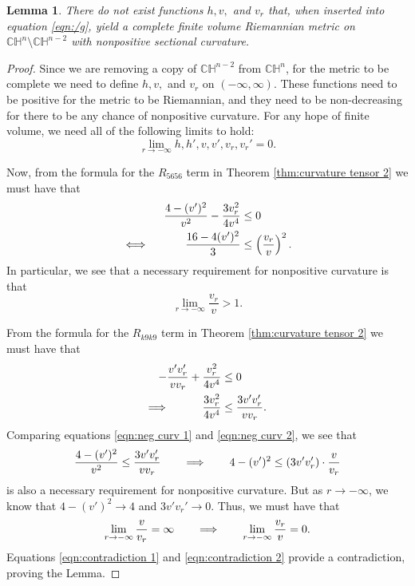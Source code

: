 \documentclass[10pt]{amsart}
\def\H{\mathbb{H}}
\def\C{\mathbb{C}}
\newtheorem{lemma}[theorem]{Lemma}
\theoremstyle{definition}
\theoremstyle{remark}
\numberwithin{equation}{section}
\begin{document}
\begin{lemma}
There do not exist functions $h, v, $ and $v_r$ that, when inserted into equation \eqref{eqn:/g}, yield a complete finite volume Riemannian metric on $\C \H^n \setminus \C \H^{n-2}$ with nonpositive sectional curvature.
\end{lemma}

\begin{proof}
Since we are removing a copy of $\C \H^{n-2}$ from $\C \H^n$, for the metric to be complete we need to define $h, v, $ and $v_r$ on $(- \infty, \infty)$.  
These functions need to be positive for the metric to be Riemannian, and they need to be non-decreasing for there to be any chance of nonpositive curvature.  
For any hope of finite volume, we need all of the following limits to hold:
	\begin{equation*}
	\lim_{r \to - \infty} h, h', v, v', v_r, v_r' = 0.
	\end{equation*}
	
Now, from the formula for the $R_{5656}$ term in Theorem \ref{thm:curvature tensor 2} we must have that
	\begin{align}
	\frac{4-(v')^2}{v^2} - \frac{3v_r^2}{4v^4} &\leq 0  \label{eqn:neg curv 1}  \\
	\iff	\hskip 30pt	\frac{16 - 4(v')^2}{3} &\leq \left( \frac{v_r}{v} \right)^2.  \nonumber
	\end{align}
In particular, we see that a necessary requirement for nonpositive curvature is that
	\begin{equation}\label{eqn:contradiction 1}
	\lim_{r \to - \infty} \frac{v_r}{v} > 1.
	\end{equation}
	
From the formula for the $R_{k9k9}$ term in Theorem \ref{thm:curvature tensor 2} we must have that
	\begin{align}
	- \frac{v' v_r'}{v v_r} + \frac{v_r^2}{4v^4} &\leq 0  \nonumber  \\
	\Longrightarrow	\hskip 30pt	\frac{3v_r^2}{4v^4} &\leq \frac{3 v' v_r'}{v v_r}.  \label{eqn:neg curv 2}
	\end{align}
Comparing equations \eqref{eqn:neg curv 1} and \eqref{eqn:neg curv 2}, we see that
	\begin{equation*}
	\frac{4 - (v')^2}{v^2} \leq \frac{3 v' v_r'}{v v_r}	\hskip 20pt	\Longrightarrow		\hskip 20pt	4 - (v')^2 \leq (3v'v_r') \cdot \frac{v}{v_r}
	\end{equation*}
is also a necessary requirement for nonpositive curvature.  
But as $r \to - \infty$, we know that $4 - (v')^2 \to 4$ and $3 v' v_r' \to 0$.  
Thus, we must have that
	\begin{equation}\label{eqn:contradiction 2}
	\lim_{r \to - \infty} \frac{v}{v_r} = \infty	\hskip 20pt	\Longrightarrow		\hskip 20pt	\lim_{r \to - \infty} \frac{v_r}{v} = 0.
	\end{equation}
Equations \eqref{eqn:contradiction 1} and \eqref{eqn:contradiction 2} provide a contradiction, proving the Lemma.
	
\end{proof}
\end{document}
